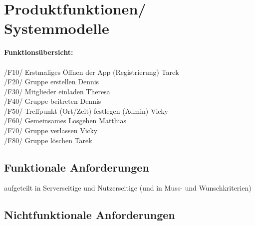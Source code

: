 \section{Produktfunktionen/ Systemmodelle}
\textbf{Funktionsübersicht:} \\
\\
/F10/ Erstmaliges Öffnen der App (Registrierung) Tarek \\
/F20/ Gruppe erstellen Dennis \\
/F30/ Mitglieder einladen Theresa \\
/F40/ Gruppe beitreten Dennis \\
/F50/ Treffpunkt (Ort/Zeit) festlegen (Admin) Vicky \\
/F60/ Gemeinsames Losgehen Matthias \\
/F70/ Gruppe verlassen Vicky \\
/F80/ Gruppe löschen Tarek \\

\newpage

\newpage
%
\newpage

\newpage

\newpage

\newpage
%
\newpage
%
\newpage

\newpage

\subsection{Funktionale Anforderungen}
aufgeteilt in Serverseitige und Nutzerseitige
(und in Muss- und Wunschkriterien)
\subsection{Nichtfunktionale Anforderungen}
